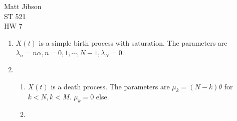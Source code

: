 \documentclass{article}
\begin{document}
\begin{flushright}
Matt Jibson \\
ST 521 \\
HW 7
\end{flushright}

\begin{enumerate}
	\item %
		$X(t)$ is a simple birth process with saturation. The parameters are $\lambda_n = n \alpha, n = 0, 1, \cdots, N - 1, \lambda_N = 0$.
	\item %
		\begin{enumerate}
			\item $X(t)$ is a death process. The parameters are $\mu_k = (N - k) \theta$ for $k < N, k < M$. $\mu_k = 0$ else.
			\item
		\end{enumerate}
\end{enumerate}
\end{document}
